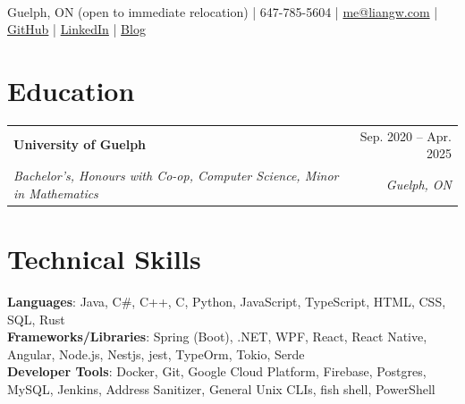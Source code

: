 \documentclass[letterpaper, 10pt]{report}
\makeatletter
\newcommand{\educationEntry}[4]{
    \begin{tabular*}{\textwidth}[t]{l@{\extracolsep{\fill}}r}
        \textbf{#1}       & #2                \\
        \textit{\small#3} & \textit{\small#4} \\
    \end{tabular*}\vspace{-0.7em}
}
\makeatother
\begin{document}
\begin{center}
    \textbf{\HUGE\color{Pink}{Liang Wang}} \\ \vspace{1.5em}
    \small Guelph, ON (open to immediate relocation) |
    647-785-5604 |
    \href{mailto:me@liangw.com}{{me@liangw.com}}  |
    \href{https://github.com/Internal-Compiler-Error}{{GitHub}} |
    \href{https://www.linkedin.com/in/liang-wang-225607174/}{{LinkedIn}} |
    \href{https://liangw.com}{{Blog}} \\
\end{center}

\section{Education}
\educationEntry{University of Guelph}{Sep. 2020 -- Apr. 2025}{Bachelor's, Honours with Co-op, Computer Science, Minor in Mathematics}{Guelph, ON}


\section{Technical Skills}
\vspace{0.1em}
\begin{itemize}[leftmargin=0em, label={}]
    \small{\item{
        \textbf{Languages}{: Java, C\#, C++, C, Python, JavaScript, TypeScript, HTML, CSS, SQL, Rust} \\
        \textbf{Frameworks/Libraries}{: Spring (Boot), .NET, WPF, React, React Native, Angular, Node.js, Nestjs, jest, TypeOrm, Tokio, Serde} \\
        \textbf{Developer Tools}{: Docker, Git, Google Cloud Platform, Firebase, Postgres, MySQL, Jenkins, Address Sanitizer, General Unix CLIs, fish shell, PowerShell} \\
    }}
\end{itemize}
\end{document}
